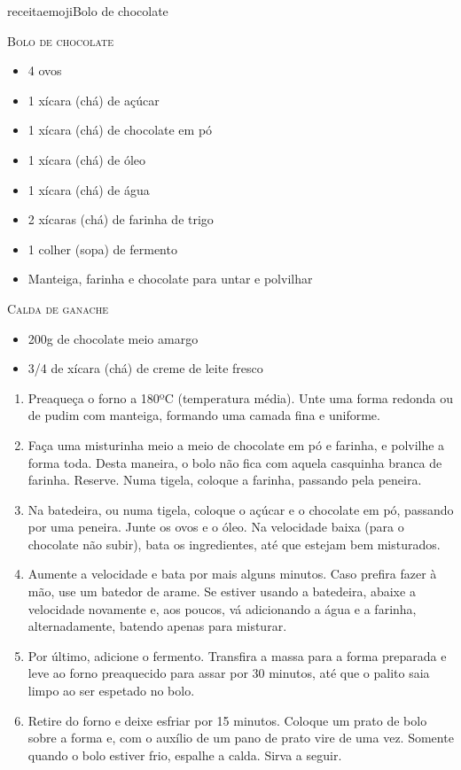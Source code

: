 receitaemoji{Bolo de chocolate}{ %
		\textsc{Bolo de chocolate}
		\begin{itemize}
			\item 4 ovos
			\item 1 xícara (chá) de açúcar
			\item 1 xícara (chá) de chocolate em pó
			\item 1 xícara (chá) de óleo
			\item 1 xícara (chá) de água
			\item 2 xícaras (chá) de farinha de trigo
			\item 1 colher (sopa) de fermento
			\item Manteiga, farinha e chocolate para untar e polvilhar
		\end{itemize}
		\textsc{Calda de ganache}
		\begin{itemize}
			\item 200g de chocolate meio amargo
			\item 3/4 de xícara (chá) de creme de leite fresco
		\end{itemize}
	}{
		\begin{enumerate}
			\item Preaqueça o forno a 180ºC (temperatura média). Unte uma forma redonda ou
			      de pudim com manteiga, formando uma camada fina e uniforme.
			\item Faça uma misturinha meio a meio de chocolate em pó e farinha, e polvilhe
			      a forma toda. Desta maneira, o bolo não fica com aquela casquinha branca de
			      farinha. Reserve. Numa tigela, coloque a farinha, passando pela peneira.
			\item Na batedeira, ou numa tigela, coloque o açúcar e o chocolate em pó,
			      passando por uma peneira. Junte os ovos e o óleo. Na velocidade baixa (para
			      o chocolate não subir), bata os ingredientes, até que estejam bem
			      misturados.
			\item Aumente a velocidade e bata por mais alguns minutos. Caso prefira fazer
			      à mão, use um batedor de arame. Se estiver usando a batedeira, abaixe a
			      velocidade novamente e, aos poucos, vá adicionando a água e a farinha,
			      alternadamente, batendo apenas para misturar.
			\item Por último, adicione o fermento. Transfira a massa para a forma
			      preparada e leve ao forno preaquecido para assar por 30 minutos, até que o
			      palito saia limpo ao ser espetado no bolo.
			\item Retire do forno e deixe esfriar por 15 minutos. Coloque um prato de bolo
			      sobre a forma e, com o auxílio de um pano de prato vire de uma vez. Somente
			      quando o bolo estiver frio, espalhe a calda. Sirva a seguir.
		\end{enumerate}
	}

